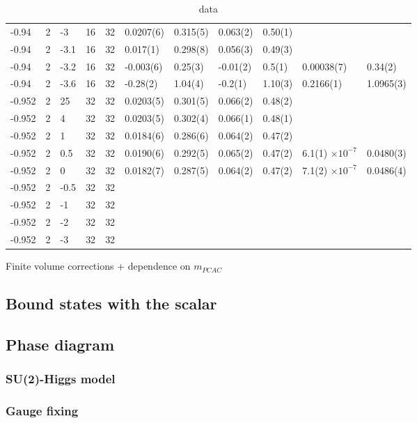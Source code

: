 \begin{table}
\begin{adjustwidth}{-4em}{-4em}
\begin{tabular}{l  l l l l l l l l l l}
-0.94 & 2 & -3 & 16 & 32 & 0.0207(6) & 0.315(5) & 0.063(2) & 0.50(1)\\
-0.94 & 2 & -3.1 & 16 & 32 & 0.017(1) & 0.298(8) & 0.056(3) & 0.49(3)\\
-0.94 & 2 & -3.2 & 16 & 32 & -0.003(6) & 0.25(3) & -0.01(2) & 0.5(1) & 0.00038(7) & 0.34(2)\\
-0.94 & 2 & -3.6 & 16 & 32 & -0.28(2) & 1.04(4) & -0.2(1) & 1.10(3) & 0.2166(1) & 1.0965(3)\\
\midrule
-0.952 & 2 & 25 & 32 & 32 & 0.0203(5) & 0.301(5) & 0.066(2) & 0.48(2)\\
-0.952 & 2 & 4 & 32 & 32 & 0.0203(5) & 0.302(4) & 0.066(1) & 0.48(1)\\
-0.952 & 2 & 1 & 32 & 32 & 0.0184(6) & 0.286(6) & 0.064(2) & 0.47(2)\\
-0.952 & 2 & 0.5 & 32 & 32 & 0.0190(6) & 0.292(5) & 0.065(2) & 0.47(2) & 6.1(1) $\times 10^{-7}$ & 0.0480(3) \\
-0.952 & 2 & 0 & 32 & 32 & 0.0182(7) & 0.287(5) & 0.064(2) & 0.47(2) &  7.1(2) $\times 10^{-7}$ & 0.0486(4)\\
-0.952 & 2 & -0.5 & 32 & 32 \\
-0.952 & 2 & -1 & 32 & 32 \\
-0.952 & 2 & -2 & 32 & 32 \\
-0.952 & 2 & -3 & 32 & 32 \\
\bottomrule
\end{tabular}
\end{adjustwidth}
\caption{data}
\label{data}
\end{table}


Finite volume corrections + dependence on $m_{PCAC}$

\subsection{Bound states with the scalar}


\subsection{Phase diagram}

\subsubsection{SU(2)-Higgs model}

\subsubsection{Gauge fixing}

